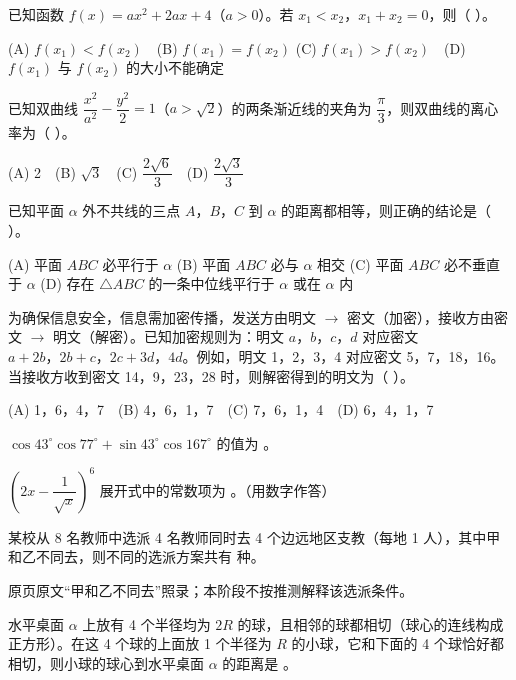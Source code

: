 \begin{question}
已知函数 \(f(x)=ax^2+2ax+4\)（\(a>0\)）。若 $x_1<x_2\text{，}x_1+x_2=0$，则（ ）。

(A) \(f(x_1)<f(x_2)\)　(B) \(f(x_1)=f(x_2)\)
(C) \(f(x_1)>f(x_2)\)　(D) \(f(x_1)\) 与 \(f(x_2)\) 的大小不能确定

\end{question}
\begin{question}
已知双曲线 \(\dfrac{x^2}{a^2}-\dfrac{y^2}{2}=1\)（\(a>\sqrt2\)）的两条渐近线的夹角为 \(\dfrac\pi3\)，则双曲线的离心率为（ ）。

(A) 2　(B) \(\sqrt3\)　(C) \(\dfrac{2\sqrt6}{3}\)　(D) \(\dfrac{2\sqrt3}{3}\)

\end{question}
\begin{question}
已知平面 \(\alpha\) 外不共线的三点 $A\text{，}B\text{，}C$ 到 \(\alpha\) 的距离都相等，则正确的结论是（ ）。

(A) 平面 \(ABC\) 必平行于 \(\alpha\)
(B) 平面 \(ABC\) 必与 \(\alpha\) 相交
(C) 平面 \(ABC\) 必不垂直于 \(\alpha\)
(D) 存在 \(\triangle ABC\) 的一条中位线平行于 \(\alpha\) 或在 \(\alpha\) 内

\end{question}
\begin{question}
为确保信息安全，信息需加密传播，发送方由明文 \(\to\) 密文（加密），接收方由密文 \(\to\) 明文（解密）。已知加密规则为：明文 $a\text{，}b\text{，}c\text{，}d$ 对应密文 $a+2b\text{，}2b+c\text{，}2c+3d\text{，}4d$。例如，明文 1，2，3，4 对应密文 5，7，18，16。当接收方收到密文 14，9，23，28 时，则解密得到的明文为（ ）。

(A) 1，6，4，7　(B) 4，6，1，7　(C) 7，6，1，4　(D) 6，4，1，7

\end{question}

\begin{question}
\(\cos43^\circ\cos77^\circ+\sin43^\circ\cos167^\circ\) 的值为 \gkblank{}。

\end{question}
\begin{question}
\(\left(2x-\dfrac1{\sqrt{x}}\right)^6\) 展开式中的常数项为 \gkblank{}。（用数字作答）

\end{question}
\begin{question}
某校从 8 名教师中选派 4 名教师同时去 4 个边远地区支教（每地 1 人），其中甲和乙不同去，则不同的选派方案共有 \gkblank{} 种。

\begin{gktip}
原页原文“甲和乙不同去”照录；本阶段不按推测解释该选派条件。
\end{gktip}

\end{question}
\begin{question}
水平桌面 \(\alpha\) 上放有 4 个半径均为 \(2R\) 的球，且相邻的球都相切（球心的连线构成正方形）。在这 4 个球的上面放 1 个半径为 \(R\) 的小球，它和下面的 4 个球恰好都相切，则小球的球心到水平桌面 \(\alpha\) 的距离是 \gkblank{}。

\end{question}

